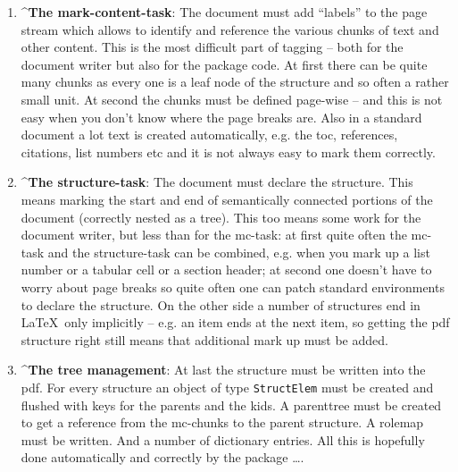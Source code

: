 \documentclass[DIV=12,parskip=half-,bibliography=totoc]{scrartcl}
\begin{document}
\begin{enumerate}
\item
  \TagP^\textbf{The mark-content-task}: The document must add \enquote{labels} to the page stream which allows to identify and reference the various chunks of text and other content.  This is the most difficult part of tagging -- both for the document writer but also for the package code. At first there can be quite many chunks as every one is a leaf node of the structure and so often a rather small unit.  At second the chunks must be defined page-wise -- and this is not easy when you don't know where the page breaks are. Also in a standard document a lot text is created automatically, e.g. the toc, references, citations, list numbers etc and it is not always easy to mark them correctly.\Pmeti

\item
  \TagP^\textbf{The structure-task}:  The document must declare the structure. This means marking the start and end of semantically connected portions of the document (correctly nested as a tree). This too means some work for the document writer, but less than for the mc-task: at first quite often the mc-task and the structure-task can be combined, e.g. when you mark up a list number or a tabular cell or a section header; at second one doesn't have to worry about page breaks so quite often one can patch standard environments to declare the structure. On the other side a number of structures end in \LaTeX\ only implicitly -- e.g. an item ends at the next item, so getting the pdf structure right still means that additional mark up must be added.
  \Pmeti

\item
 \TagP^\textbf{The tree management}: At last the structure must be written into the pdf. For every structure an object of type \texttt{StructElem} must be  created and flushed with keys for the parents and the kids. A parenttree must be created to get a reference from the mc-chunks to the parent structure. A rolemap must be written. And a number of dictionary entries. All this is hopefully done automatically and correctly by the package \ldots.
 \Pmeti
\end{enumerate}
\end{document}
